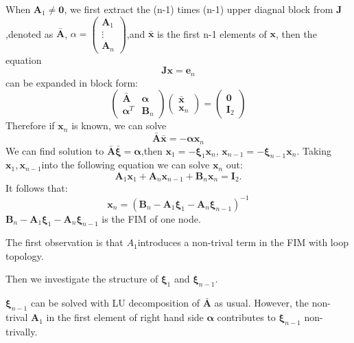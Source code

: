 \documentclass[12pt]{article}
\begin{document}
When $\bm{A}_1 \neq \bm{0}$, we first extract the (n-1) times (n-1) upper diagnal block from $\bm{J}$,denoted as $\bar{\bm{A}}$,
$\alpha=\begin{pmatrix}
\bm{A}_1\\ \vdots\\ \bm{A}_n
\end{pmatrix}
$,and $\bm{\bar{x}}$ is the first n-1 elements of $\bm{x}$,
then the equation \[
\bm{J}\bm{x}=\bm{e}_{n}
\]
can be expanded in block form:
\begin{equation}
\begin{pmatrix}
\bar{\bm{A}}&\bm{\alpha}\\
\bm{\alpha}^T&\bm{B}_n
\end{pmatrix}\begin{pmatrix}
\bm{\bar{x}}\\ \bm{x}_n
\end{pmatrix}=\begin{pmatrix}
\bm{0}\\ \bm{I}_2
\end{pmatrix}
\end{equation}
Therefore if $\bm{x}_n$ is known, we can solve 
\[
\bm{\bar{A}}\bm{\bar{x}}=-\bm{\alpha} \bm{x}_n
\]
We can find solution to $\bm{\bar{A}}\bm{\bar{\xi}}=\bm{\alpha}$,then $\bm{x}_1=-\bm{\xi}_1 \bm{x}_n$,
$\bm{x}_{n-1}=-\bm{\xi}_{n-1}\bm{x}_n$.
Taking $\bm{x}_1,\bm{x}_{n-1}$into the following equation we can solve $\bm{x}_n$ out:
\[
\bm{A}_1 \bm{x}_1+\bm{A}_{n}\bm{x}_{n-1}+\bm{B}_n \bm{x}_n=\bm{I}_2.
\]
It follows that:
\[
\bm{x}_n=(\bm{B}_n-\bm{A}_1\bm{\xi}_1-\bm{A}_n\bm{\xi}_{n-1})^{-1}
\]
$\bm{B}_n-\bm{A}_1\bm{\xi}_1-\bm{A}_n\bm{\xi}_{n-1}$ is the FIM of one node.

The first observation is that $A_1$introduces a non-trival term in the FIM with loop topology.

Then we investigate the structure of $\bm{\xi}_1$ and $\bm{\xi}_{n-1}$.

$\bm{\xi}_{n-1}$ can be solved with LU decomposition of $\bm{\bar{A}}$ as usual. However, the non-trival $\bm{A}_1$ in the first element of right hand side $\bm{\alpha}$ contributes to $\bm{\xi}_{n-1}$ non-trivally. 
\end{document}
